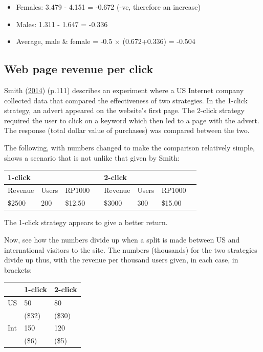 \documentclass[
  10pt,
  b5paper]{book}
\providecommand{\tightlist}{%
  \setlength{\itemsep}{0pt}\setlength{\parskip}{0pt}}
\begin{document}
\begin{itemize}
\tightlist
\item
  Females: 3.479 - 4.151 = -0.672 (-ve, therefore an increase)
\item
  Males: 1.311 - 1.647 = -0.336
\item
  Average, male \& female = -0.5 \(\times\) (0.672+0.336) = -0.504
\end{itemize}

\hypertarget{web-page-revenue-per-click}{%
\subsection*{Web page revenue per click}\label{web-page-revenue-per-click}}

Smith (\protect\hyperlink{ref-smith-sd}{2014}) (p.111) describes an experiment where a US Internet company
collected data that compared the effectiveness of two strategies.
In the 1-click strategy, an advert appeared on the website's first page.
The 2-click strategy required the user to click on a keyword which
then led to a page with the advert. The response (total dollar value
of purchases) was compared between the two.

The following, with numbers changed to make the comparison relatively
simple, shows a scenario that is not unlike that given by Smith:

\begin{longtable}[]{@{}llllllll@{}}
\toprule\noalign{}
1-click & & & & 2-click & & & \\
\midrule\noalign{}
\endhead
\bottomrule\noalign{}
\endlastfoot
Revenue & Users & RP1000 & & Revenue & Users & RP1000 & \\
\$2500 & 200 & \$12.50 & & \$3000 & 300 & \$15.00 & \\
\end{longtable}

The 1-click strategy appears to give a better return.

Now, see how the numbers divide up when a split is made between
US and international visitors to the site.
The numbers (thousands) for the two strategies divide up thus,
with the revenue per thousand users given, in each case, in brackets:

\begin{longtable}[]{@{}lll@{}}
\toprule\noalign{}
& 1-click & 2-click \\
\midrule\noalign{}
\endhead
\bottomrule\noalign{}
\endlastfoot
US & 50 & 80 \\
& (\$32) & (\$30) \\
Int & 150 & 120 \\
& (\$6) & (\$5) \\
\end{longtable}
\end{document}
